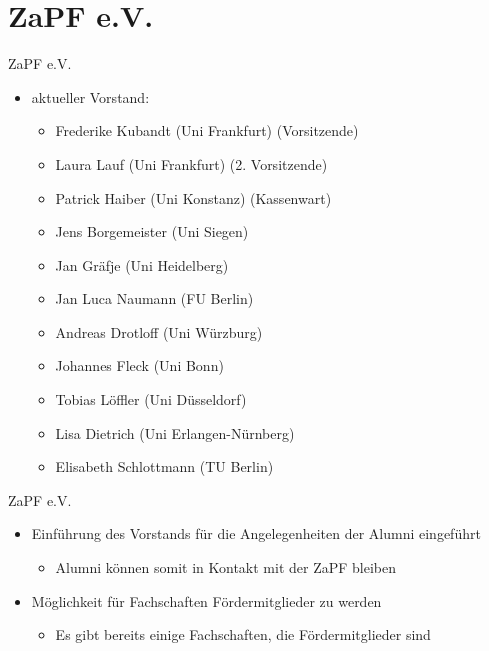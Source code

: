 \documentclass[compress, aspectratio=169]{beamer}
\begin{document}
\section{ZaPF e.V.}


\begin{frame}{ZaPF e.V.}       
    \begin{itemize}                         
        \item[] aktueller Vorstand:                           
        \begin{itemize}                          
             \item Frederike Kubandt (Uni Frankfurt) (Vorsitzende)                           
             \item Laura Lauf (Uni Frankfurt) (2. Vorsitzende)                           
             \item Patrick Haiber (Uni Konstanz) (Kassenwart)                           
             \item Jens Borgemeister (Uni Siegen)                           
             \item Jan Gräfje (Uni Heidelberg)                           
             \item Jan Luca Naumann (FU Berlin)                           
             \item Andreas Drotloff (Uni Würzburg)                           
             \item Johannes Fleck (Uni Bonn)
             \item Tobias Löffler (Uni Düsseldorf)                           
             \item Lisa Dietrich (Uni Erlangen-Nürnberg)                          
             \item Elisabeth Schlottmann (TU Berlin)
        \end{itemize}                         
    \end{itemize}                       
\end{frame}                        
                      
                      
\begin{frame}{ZaPF e.V.}                        
     \begin{itemize}                          
     \item Einführung des Vorstands für die Angelegenheiten der Alumni eingeführt                       
      \begin{itemize}
      \item Alumni können somit in Kontakt mit der ZaPF bleiben
      \end{itemize}
      \item Möglichkeit für Fachschaften Fördermitglieder zu werden
      \begin{itemize}
      \item Es gibt bereits einige Fachschaften, die Fördermitglieder sind
      \end{itemize}
      \end{itemize}
\end{frame}            
\end{document}
